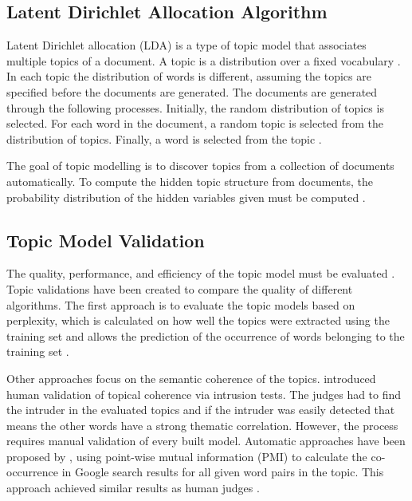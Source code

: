 \subsection{Latent Dirichlet Allocation Algorithm} \label{ssec:LDAA}

Latent Dirichlet allocation (LDA) is a type of topic model that associates multiple topics of a document. A topic is a distribution over a fixed vocabulary \cite{chaney2012visualizing}. In each topic the distribution of words is different, assuming the topics are specified before the documents are generated. The documents are generated through the following processes. Initially, the random distribution of topics is selected. For each word in the document, a random topic is selected from the distribution of topics. Finally, a word is selected from the topic \cite{blei2003latent,mekonnen2017topic}.

The goal of topic modelling is to discover topics from a collection of documents automatically. To compute the hidden topic structure from documents, the probability distribution of the hidden variables given must be computed \cite{mimno2012sparse}.

\subsection{Topic Model Validation}

The quality, performance, and efficiency of the topic model must be evaluated \cite{ramirez2012topic}. Topic validations have been created to compare the quality of different algorithms. The first approach is to evaluate the topic models based on perplexity, which is calculated on how well the topics were extracted using the training set and allows the prediction of the occurrence of words belonging to the training set \cite{ramirez2012topic}.

Other approaches focus on the semantic coherence of the topics.  introduced human validation of topical coherence via intrusion tests. The judges had to find the intruder in the evaluated topics and if the intruder was easily detected that means the other words have a strong thematic correlation. However, the process requires manual validation of every built model. Automatic approaches have been proposed by , using point-wise mutual information (PMI) to calculate the co-occurrence in Google search results for all given word pairs in the topic. This approach achieved similar results as human judges \cite{alsumait2009topic}.

